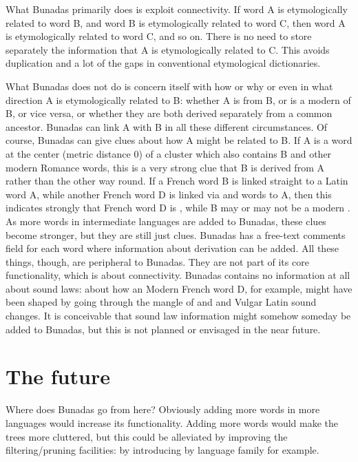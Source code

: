 \documentclass[output=paper,colorlinks,citecolor=brown]{langscibook}
\begin{document}
What Bunadas primarily does is exploit connectivity. If word A is etymologically related to word B, and word B is etymologically related to word C, then word A is etymologically related to word C, and so on. There is no need to store separately the information that A is etymologically related to C. This avoids duplication and a lot of the gaps in conventional etymological dictionaries.

What Bunadas does not do is concern itself with how or why or even in what direction A is etymologically related to B: whether A is  from B, or is a modern  of B, or vice versa, or whether they are both derived separately from a common ancestor. Bunadas can link A with B in all these different circumstances. Of course, Bunadas can give clues about how A might be related to B. If A is a  word at the center (metric distance 0) of a cluster which also contains B and other modern Romance words, this is a very strong clue that B is derived from A rather than the other way round. If a French word B is linked straight to a Latin word A, while another French word D is linked via  and  words to A, then this indicates strongly that  French word D is , while B may or may not be a modern . As more words in intermediate languages are added to Bunadas, these clues become stronger, but they are still just clues. Bunadas has a free-text comments field for each word where information about derivation can be added. All these things, though, are peripheral to Bunadas. They are not part of its core functionality, which is about connectivity. Bunadas contains no information at all about sound laws: about how an  Modern French word D, for example, might have been shaped by going through the mangle of  and  and Vulgar Latin sound changes. It is conceivable that sound law information might somehow someday be added to Bunadas, but this is not planned or envisaged in the near future.

\section{The future}

Where does Bunadas go from here? Obviously adding more words in more languages would increase its functionality. Adding more words would make the trees more cluttered, but this could be alleviated by improving the filtering/prun\-ing facilities: by introducing  by language family for example.
\end{document}
